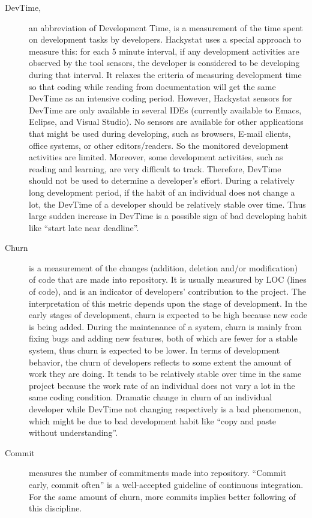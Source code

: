 \begin{description}
\item[DevTime,] an abbreviation of Development Time, is a measurement of the time spent on development tasks by developers. Hackystat uses a special approach to measure this: for each 5 minute interval, if any development activities are observed by the tool sensors, the developer is considered to be developing during that interval. It relaxes the criteria of measuring development time so that coding while reading from documentation will get the same DevTime as an intensive coding period. However, Hackystat sensors for DevTime are only available in several IDEs (currently available to Emacs, Eclipse, and Visual Studio). No sensors are available for other applications that might be used during developing, such as browsers, E-mail clients, office systems, or other editors/readers. So the monitored development activities are limited. Moreover, some development activities, such as reading and learning, are very difficult to track. Therefore, DevTime should not be used to determine a developer's effort. During a relatively long development period, if the habit of an individual does not change a lot, the DevTime of a developer should be relatively stable over time. Thus large sudden increase in DevTime is a possible sign of bad developing habit like ``start late near deadline''.

\item[Churn] 
is a measurement of the changes (addition, deletion and/or modification) of code that are made into repository. It is usually measured by LOC (lines of code), and is an indicator of developers' contribution to the project. The interpretation of this metric depends upon the stage of development. In the early stages of development, churn is expected to be high because new code is being added. During the maintenance of a system, churn is mainly from fixing bugs and adding new features, both of which are fewer for a stable system, thus churn is expected to be lower. In terms of development behavior, the churn of developers reflects to some extent the amount of work they are doing. It tends to be relatively stable over time in the same project because the work rate of an individual does not vary a lot in the same coding condition. Dramatic change in churn of an individual developer while DevTime not changing respectively is a bad phenomenon, which might be due to bad development habit like ``copy and paste without understanding''.

\item[Commit] 
measures the number of commitments made into repository. ``Commit early, commit often'' is a well-accepted guideline of continuous integration\cite{continuousintegration}. For the same amount of churn, more commits implies better following of this discipline.


\end{description}
